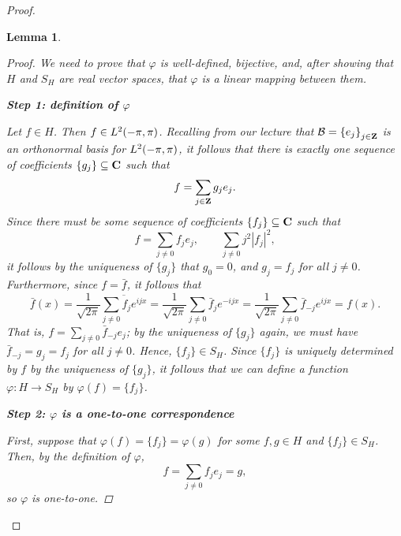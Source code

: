 \documentclass{homework}
\newtheorem{lemma}{Lemma}
\begin{document}
\begin{arabicparts}
\begin{proof}
\begin{lemma}
		\newcommand{\basis}{\mathcal{B}}
		\newcommand{\n}{\frac{1}{\sqrt{2\pi}}}
		\begin{proof}
			We need to prove that $\varphi$ is well-defined, bijective, and, after showing that $H$ and $S_H$ are real vector spaces, that $\varphi$ is a linear mapping between them.
			
			\textbf{Step 1: definition of $\varphi$}
			
			Let $f \in H$. Then $f \in L^2(-\pi,\pi)$. Recalling from our lecture that $\basis = \left\{e_j\right\}_{j\in\Z}$ is an orthonormal basis for $L^2(-\pi,\pi)$, it follows that there is exactly one sequence of coefficients $\{g_j\}\subseteq\textbf{C}$ such that
			\begin{equation}
				f = \sum_{j\in\textbf{Z}}g_je_j.
			\end{equation}
			Since there must be \textit{some} sequence of coefficients $\{f_j\} \subseteq\textbf{C}$ such that
			\begin{equation}
				f = \sum_{j\ne 0}f_je_j,\qquad \sum_{j\ne0}j^2|f_j|^2,
			\end{equation}
			it follows by the uniqueness of $\{g_j\}$ that $g_0 = 0$, and $g_j = f_j$ for all $j \ne 0$. Furthermore, since $f = \bar{f}$, it follows that
			\begin{equation}
				\bar{f}(x) = \n\overline{\sum_{j\ne 0}f_je^{ijx}} = \n\sum_{j\ne 0}\bar{f}_je^{-ijx}=\n\sum_{j\ne0}\bar{f}_{-j}e^{ijx} = f(x).
			\end{equation}
			That is, $f = \sum\limits_{j\ne 0}\bar{f}_{-j}e_j$; by the uniqueness of $\{g_j\}$ again, we must have $\bar{f}_{-j} = g_j = f_j$ for all $j \ne 0$. Hence, $\{f_j\} \in S_H$. Since $\{f_j\}$ is uniquely determined by $f$ by the uniqueness of $\{g_j\}$, it follows that we can define a function $\varphi : H \to S_H$ by $\varphi(f) = \{f_j\}$.
			
			\textbf{Step 2: $\varphi$ is a one-to-one correspondence}
			
			First, suppose that $\varphi(f) = \{f_j\} = \varphi(g)$ for some $f,g \in H$ and $\{f_j\} \in S_H$. Then, by the definition of $\varphi$,
			\begin{equation}
				f = \sum_{j\ne 0}f_je_j = g,
			\end{equation}
			so $\varphi$ is one-to-one.
			

\end{proof}
\end{lemma}
\end{proof}
\end{arabicparts}
\end{document}
